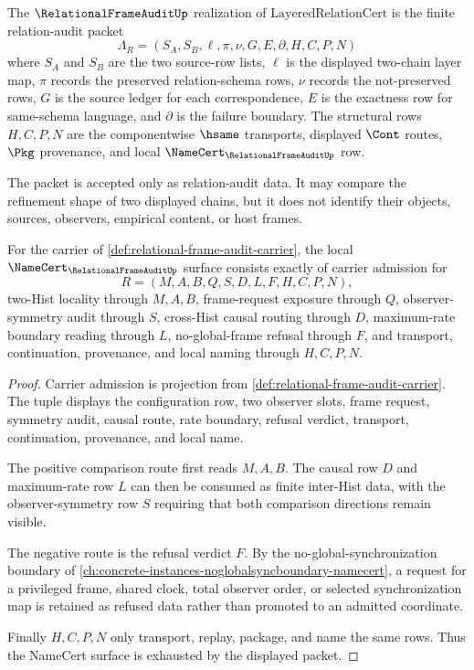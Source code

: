 \begin{definition}
\label{def:layeredrelationcert-carrier}
The $\RelationalFrameAuditUp$ realization of $\mathrm{LayeredRelationCert}$ is the finite relation-audit packet
$$
\Lambda_R=(S_A,S_B,\ell,\pi,\nu,G,E,\partial,H,C,P,N)
$$
where $S_A$ and $S_B$ are the two source-row lists, $\ell$ is the displayed two-chain layer map, $\pi$ records the preserved relation-schema rows, $\nu$ records the not-preserved rows, $G$ is the source ledger for each correspondence, $E$ is the exactness row for same-schema language, and $\partial$ is the failure boundary. The structural rows $H,C,P,N$ are the componentwise $\hsame$ transports, displayed $\Cont$ routes, $\Pkg$ provenance, and local $\NameCert_{\RelationalFrameAuditUp}$ row.

The packet is accepted only as relation-audit data. It may compare the refinement shape of two displayed chains, but it does not identify their objects, sources, observers, empirical content, or host frames.
\end{definition}

\begin{theorem}
\label{thm:relational-frame-audit-namecert-obligations}
For the carrier of \autoref{def:relational-frame-audit-carrier}, the local $\NameCert_{\RelationalFrameAuditUp}$ surface consists exactly of carrier admission for
$$
R=(M,A,B,Q,S,D,L,F,H,C,P,N),
$$
two-Hist locality through $M,A,B$, frame-request exposure through $Q$, observer-symmetry audit through $S$, cross-Hist causal routing through $D$, maximum-rate boundary reading through $L$, no-global-frame refusal through $F$, and transport, continuation, provenance, and local naming through $H,C,P,N$.
\end{theorem}
\begin{proof}
Carrier admission is projection from \autoref{def:relational-frame-audit-carrier}. The tuple displays the configuration row, two observer slots, frame request, symmetry audit, causal route, rate boundary, refusal verdict, transport, continuation, provenance, and local name.

The positive comparison route first reads $M,A,B$. The causal row $D$ and maximum-rate row $L$ can then be consumed as finite inter-Hist data, with the observer-symmetry row $S$ requiring that both comparison directions remain visible.

The negative route is the refusal verdict $F$. By the no-global-synchronization boundary of \autoref{ch:concrete-instances-noglobalsyncboundary-namecert}, a request for a privileged frame, shared clock, total observer order, or selected synchronization map is retained as refused data rather than promoted to an admitted coordinate.

Finally $H,C,P,N$ only transport, replay, package, and name the same rows. Thus the NameCert surface is exhausted by the displayed packet.
\end{proof}

